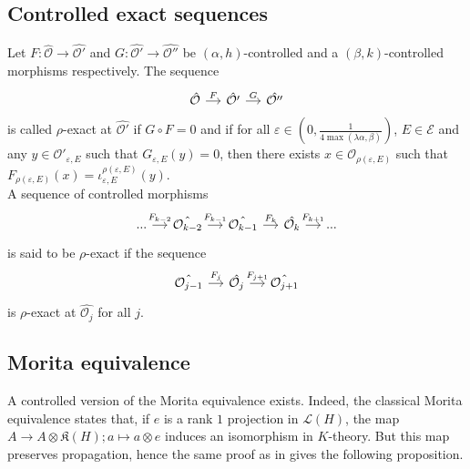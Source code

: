 \subsection{Controlled exact sequences}

\begin{definition}
Let $F : \hat{\mathcal O}\rightarrow \hat{\mathcal O'}$ and $G : \hat{\mathcal O'}\rightarrow \hat{\mathcal O''}$ be $(\alpha,h)$-controlled and a $(\beta,k)$-controlled morphisms respectively. The sequence
\[\begin{tikzcd}[column sep = small] \hat{\mathcal O} \arrow{r}{F} & \hat{\mathcal O'} \arrow{r}{G} & \hat{\mathcal O''} \end{tikzcd}\]
is called $\rho$-exact at $\hat{\mathcal O'}$ if $G\circ F=0$ and if for all $\varepsilon\in (0,\frac{1}{4 \max (\lambda \alpha,\beta)})$, $E\in\mathcal E$ and any $y\in \mathcal O'_{\varepsilon,E}$ such that $G_{\varepsilon,E}(y) = 0$, then there exists $x\in \mathcal O_{\rho(\varepsilon,E)}$ such that $F_{\rho(\varepsilon,E)}(x)=\iota_{\varepsilon,E}^{\rho(\varepsilon,E)} (y)$.\\
A sequence of controlled morphisms 
\[\begin{tikzcd}[column sep = small] ... \arrow{r}{F_{k-2}} & \hat{\mathcal O_{k-2}} \arrow{r}{F_{k-1}} & \hat{\mathcal O_{k-1}} \arrow{r}{F_k} & \hat{\mathcal O_k} \arrow{r}{F_{k+1}} & ... \end{tikzcd}\] 
is said to be $\rho$-exact if the sequence
\[\begin{tikzcd}[column sep = small] \hat{\mathcal O_{j-1}} \arrow{r}{F_{j}} & \hat{\mathcal O_{j}} \arrow{r}{F_{j+1}} & \hat{\mathcal O_{j+1}} \end{tikzcd}\]
is $\rho$-exact at $\hat{\mathcal O_j}$ for all $j$.
\end{definition}

\subsection{Morita equivalence}

A controlled version of the Morita equivalence exists. Indeed, the classical Morita equivalence states that, if $e$ is a rank $1$ projection in $\mathcal L (H)$, the map $A\rightarrow A\otimes \mathfrak K(H) ; a\mapsto a\otimes e$ induces an isomorphism in $K$-theory. But this map preserves propagation, hence the same proof as in \cite{OY2} gives the following proposition.

